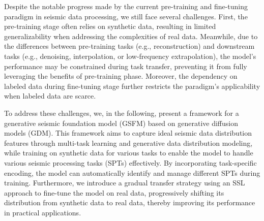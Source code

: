 Despite the notable progress made by the current pre-training and fine-tuning paradigm in seismic data processing, we still face several challenges. First, the pre-training stage often relies on synthetic data, resulting in limited generalizability when addressing the complexities of real data. Meanwhile, due to the differences between pre-training tasks (e.g., reconstruction) and downstream tasks (e.g., denoising, interpolation, or low-frequency extrapolation), the model's performance may be constrained during task transfer, preventing it from fully leveraging the benefits of pre-training phase. Moreover, the dependency on labeled data during fine-tuning stage further restricts the paradigm’s applicability when labeled data are scarce. 

To address these challenges, we, in the following, present a framework for a generative seismic foundation model (GSFM) based on generative diffusion models (GDM). This framework aims to capture ideal seismic data distribution features through multi-task learning and generative data distribution modeling, while training on synthetic data for various tasks to enable the model to handle various seismic processing tasks (SPTs) effectively. By incorporating task-specific encoding, the model can automatically identify and manage different SPTs during training. Furthermore, we introduce a gradual transfer strategy using an SSL approach to fine-tune the model on real data, progressively shifting its distribution from synthetic data to real data, thereby improving its performance in practical applications. 